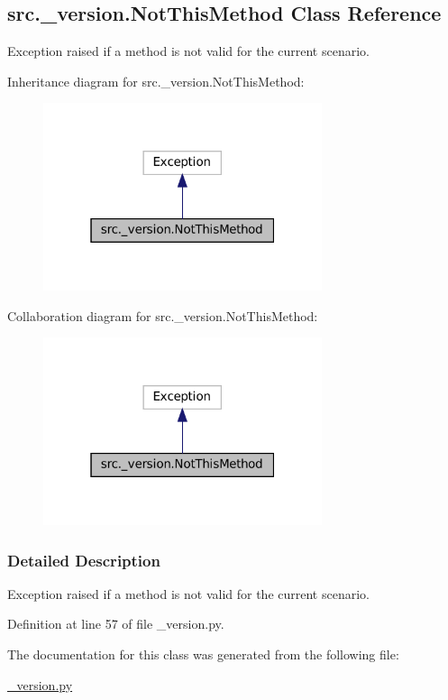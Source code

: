 \hypertarget{classsrc_1_1__version_1_1NotThisMethod}{}\subsection{src.\+\_\+version.\+Not\+This\+Method Class Reference}
\label{classsrc_1_1__version_1_1NotThisMethod}


Exception raised if a method is not valid for the current scenario.  




Inheritance diagram for src.\+\_\+version.\+Not\+This\+Method\+:
\nopagebreak
\begin{figure}[H]
\begin{center}
\leavevmode
\includegraphics[width=232pt]{classsrc_1_1__version_1_1NotThisMethod__inherit__graph}
\end{center}
\end{figure}


Collaboration diagram for src.\+\_\+version.\+Not\+This\+Method\+:
\nopagebreak
\begin{figure}[H]
\begin{center}
\leavevmode
\includegraphics[width=232pt]{classsrc_1_1__version_1_1NotThisMethod__coll__graph}
\end{center}
\end{figure}


\subsubsection{Detailed Description}
Exception raised if a method is not valid for the current scenario. 



Definition at line 57 of file \+\_\+version.\+py.



The documentation for this class was generated from the following file\+:\begin{DoxyCompactItemize}
\item 
\hyperlink{__version_8py}{\+\_\+version.\+py}\end{DoxyCompactItemize}
